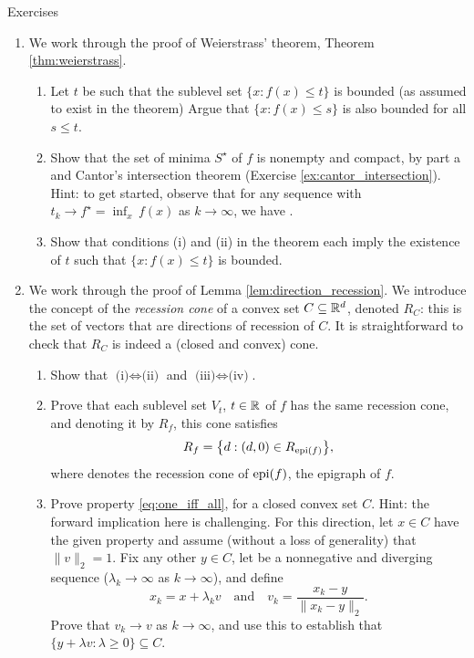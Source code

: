 \begin{xcb}{Exercises}
\begin{enumerate}[label=\thechapter.\arabic*]
\item \label{ex:weierstrass} 
  We work through the proof of Weierstrass' theorem, Theorem
  \ref{thm:weierstrass}. 

\begin{enumerate}[label=\alph*.]
\item Let $t$ be such that the sublevel set $\{x : f(x) \leq t\}$ is bounded (as
  assumed to exist in the theorem) Argue that $\{x : f(x) \leq s\}$ is also
  bounded for all $s \leq t$. 

\item Show that the set of minima $S^\star$ of $f$ is nonempty and compact,
  by part a and Cantor's intersection theorem (Exercise
  \ref{ex:cantor_intersection}). Hint: to get started, observe that for any 
  sequence  with $t_k \to f^\star = \inf_x \,
  f(x)$ as $k \to \infty$, we have .   

\item Show that conditions (i) and (ii) in the theorem each imply the existence
  of $t$ such that $\{x : f(x) \leq t\}$ is bounded. 
\end{enumerate}

\item \label{ex:direction_recession}
  We work through the proof of Lemma \ref{lem:direction_recession}. We introduce
  the concept of the \emph{recession cone} of a convex set $C \subseteq \mathbb{R}^d$, 
  denoted $R_C$: this is the set of vectors that are directions of recession of
  $C$. It is straightforward to check that $R_C$ is indeed a (closed and convex) 
  cone. 

\begin{enumerate}[label=\alph*.]
\item Show that $\text{(i)} \iff \text{(ii)}$ and $\text{(iii)} \iff
  \text{(iv)}$. 

\item Prove that each sublevel set $V_t$, $t \in \mathbb{R}$ of $f$ has the same
  recession cone, and denoting it by $R_f$, this cone satisfies 
  \[
  R_f = \big\{ d : (d,0) \in R_{\operatorname{epi}(f)} \big\},
  \]
  where  denotes the recession cone of $\operatorname{epi}(f)$, the
  epigraph of $f$. 

\item Prove property \eqref{eq:one_iff_all}, for a closed convex set $C$. Hint:
  the forward implication here is challenging. For this direction, let $x \in C$
  have the given property and assume (without a loss of generality) that
  $\|v\|_2 =  1$. Fix any other $y \in C$, let
   be a nonnegative and diverging sequence
  ($\lambda_k \to \infty$ as $k \to \infty$), and define 
  \[
  x_k = x + \lambda_k v \quad \text{and} \quad v_k = \frac{x_k - y}{\|x_k -
    y\|_2}. 
  \] 
  Prove that $v_k \to v$ as $k \to \infty$, and use this to establish that $\{y
  + \lambda v : \lambda \geq 0\} \subseteq C$. 


\end{enumerate}
\end{enumerate}
\end{xcb}
